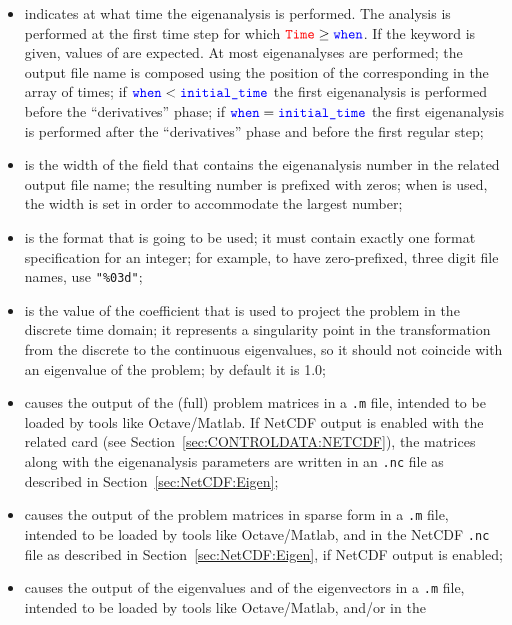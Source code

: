 \begin{itemize}
\item {} indicates at what time the eigenanalysis is performed.
	The analysis is performed at the first time step for which
	$\textcolor{red}{\texttt{Time}} \ge \textcolor{blue}{\texttt{when}}$.
	If the keyword  is given,  values
	of  are expected.  At most  eigenanalyses
	are performed; the output file name is composed using
	the position of the corresponding  in the array
	of times;
	if $\textcolor{blue}{\texttt{when}} < \textcolor{blue}{\texttt{initial\_time}}$ the first eigenanalysis
	is performed before the ``derivatives'' phase;
	if $\textcolor{blue}{\texttt{when}} = \textcolor{blue}{\texttt{initial\_time}}$ the first eigenanalysis
	is performed after the ``derivatives'' phase
	and before the first regular step;
\item {} is the width of the field that contains the eigenanalysis number
	in the related output file name; the resulting number is prefixed with zeros;
	when  is used, the width is set in order to accommodate
	the largest number;
\item {} is the format that is going to be used; it must contain exactly one
	format specification for an integer; for example, to have zero-prefixed, three digit
	file names, use \texttt{"\%03d"};
\item {} is the value of the coefficient that is used to project
	the problem in the discrete time domain; it represents
	a singularity point in the transformation from the discrete
	to the continuous eigenvalues, so it should not coincide with
	an eigenvalue of the problem;  by default it is 1.0;
\item {} causes the output
	of the (full) problem matrices in a \texttt{.m} file,
	intended to be loaded by tools like Octave/Matlab. If
	NetCDF output is enabled with the related 
	card (see Section~\ref{sec:CONTROLDATA:NETCDF}), 
	the matrices along with the eigenanalysis parameters 
	are written in an \texttt{.nc} file as described in 
	Section~\ref{sec:NetCDF:Eigen};
\item {} causes the output
	of the problem matrices in sparse form in a \texttt{.m} file,
	intended to be loaded by tools like Octave/Matlab, and in the
	NetCDF \texttt{.nc} file as described in 
	Section~\ref{sec:NetCDF:Eigen}, if NetCDF output is enabled;
\item {} causes the output of the eigenvalues
	and of the eigenvectors in a \texttt{.m} file,
	intended to be loaded by tools like Octave/Matlab, and/or in the

\end{itemize}
